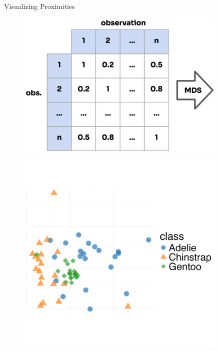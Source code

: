 \documentclass[11pt,compress,t,notes=noshow, xcolor=table]{beamer}
\begin{document}
\begin{vbframe}{Visualizing Proximities}

\vspace{-5ex}
\begin{figure}
\centering
\begin{minipage}{.5\textwidth}
  \centering
  \includegraphics[width=0.9\textwidth]{figure_man/forest-prox-matrix.png}
\end{minipage}%
\begin{minipage}{.5\textwidth}
  \centering
  \includegraphics[width=0.9\textwidth]{figure/forest-prox-vis_1.png}
\end{minipage}
\end{figure}
\vspace{-3ex}


\end{vbframe}
\end{document}
